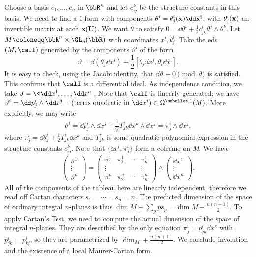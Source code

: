\begin{example}
    Choose a basis $e_1,\ldots,e_n$ in $\bbR^n$ and let $c_{ij}^k$ be the structure constants in this basis. We need to find a $1$-form with components $\theta^i=\theta^i_j(\bf{x})\dd x^j$, with $\theta^i_j(\bf{x})$ an invertible matrix at each $\bf{x}(U)$. We want $\theta$ to satisfy $0=\dd\theta^i+\frac12 c^i_{jk}\theta^j\wedge\theta^k$. Let $M\coloneqq \bbR^n\times\GL_n(\bbR)$ with coordinates $x^i,\theta^i_j$. Take the \gls{eds} $(M,\calI)$ generated by the components $\vartheta^i$ of the form 
    \[\vartheta=\dd(\theta_j\dd x^j)+\frac12[\theta_j\dd x^j,\theta_i\dd x^i].\]
    It is easy to check, using the Jacobi identity, that $\dd\vartheta\equiv 0\pmod{\vartheta}$ is satisfied. This confirms that $\calI$ is a differential ideal. As independence condition, we take $J=\<\dd x^1,\ldots,\dd x^n\>$. Note that $\calI$ is linearly generated: we have $\vartheta^i=\dd p^i_j\wedge\dd x^j+(\text{terms quadratic in }\dd x^i)\in\Omega^{\smbullet,1}(M)$. More explicitly, we may write 
    \[\vartheta^i=\dd p^i_j\wedge\dd x^j+\frac12 T^i_{jk}\dd x^k\wedge\dd x^j=\pi^i_j\wedge\dd x^j,\]
    where $\pi^i_j=\dd\theta^i_j+\frac12 T^i_{jk}\dd x^k$ and $T^i_{jk}$ is some quadratic polynomial expression in the structure constants $c^k_{ij}$. Note that $\{\dd x^i,\pi^i_j\}$ form a coframe on $M$. We have 
    \[
        \begin{pmatrix}
            \vartheta^1\\
            \vdots\\
            \vartheta^n
        \end{pmatrix}=
        \begin{pmatrix}
            \pi^1_1 & \pi^1_2 & \cdots & \pi^1_n\\
            \vdots & & & \vdots \\
            \pi^n_1 & \pi^n_2 & \cdots & \pi^n_n
        \end{pmatrix} \wedge 
        \begin{pmatrix}
            \dd x^1\\ \vdots \\ \dd x^n
        \end{pmatrix}.
    \]
    All of the components of the tableau here are linearly independent, therefore we read off Cartan characters $s_1=\cdots=s_n=n$. The predicted dimension of the space of ordinary integral $n$-planes is thus $\dim M+\sum_p ps_p=\dim M+\frac{n(n+1)}{2}$. To apply Cartan's Test, we need to compute the actual dimension of the space of integral $n$-planes. They are described by the only equation $\pi^i_j=p^i_{jk}\dd x^k$ with $p^i_{jk}=p^i_{kj}$, so they are parametrized by $\dim_M + \frac{n(n+1)}{2}$. We conclude involution and the existence of a local Maurer-Cartan form.
\end{example}

